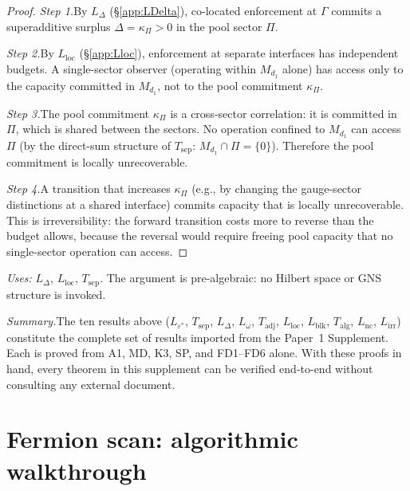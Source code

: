 \documentclass[11pt,a4paper]{article}
\theoremstyle{definition}
\begin{document}
\begin{proof}
\textit{Step 1.}\quad By $L_\Delta$ (\S\ref{app:LDelta}), co-located
enforcement at $\Gamma$ commits a superadditive surplus
$\Delta = \kappa_\Pi > 0$ in the pool sector $\Pi$.

\textit{Step 2.}\quad By $L_{\mathrm{loc}}$ (\S\ref{app:Lloc}),
enforcement at separate interfaces has independent budgets.  A
single-sector observer (operating within $M_{d_1}$ alone) has access
only to the capacity committed in $M_{d_1}$, not to the pool
commitment $\kappa_\Pi$.

\textit{Step 3.}\quad The pool commitment $\kappa_\Pi$ is a
cross-sector correlation: it is committed in $\Pi$, which is shared
between the sectors.  No operation confined to $M_{d_1}$ can access
$\Pi$ (by the direct-sum structure of $T_{\mathrm{sep}}$:
$M_{d_1} \cap \Pi = \{0\}$).  Therefore the pool commitment is locally
unrecoverable.

\textit{Step 4.}\quad A transition that increases $\kappa_\Pi$ (e.g.,
by changing the gauge-sector distinctions at a shared interface) commits
capacity that is locally unrecoverable.  This is irreversibility: the
forward transition costs more to reverse than the budget allows, because
the reversal would require freeing pool capacity that no single-sector
operation can access.
\end{proof}

\noindent\textit{Uses:} $L_\Delta$, $L_{\mathrm{loc}}$,
$T_{\mathrm{sep}}$.  The argument is pre-algebraic: no Hilbert space
or GNS structure is invoked.

\medskip\noindent\textit{Summary.}\quad The ten results above
($L_{\varepsilon^*}$, $T_{\mathrm{sep}}$, $L_\Delta$, $L_\omega$,
$T_{\mathrm{adj}}$, $L_{\mathrm{loc}}$, $L_{\mathrm{blk}}$,
$T_{\mathrm{alg}}$, $L_{\mathrm{nc}}$, $L_{\mathrm{irr}}$) constitute
the complete set of results imported from the Paper~1 Supplement.  Each
is proved from A1, MD, K3, SP, and FD1--FD6 alone.  With these proofs
in hand, every theorem in this supplement can be verified end-to-end
without consulting any external document.




\section{Fermion scan: algorithmic walkthrough}
\label{app:scan_walkthrough}
\end{document}
